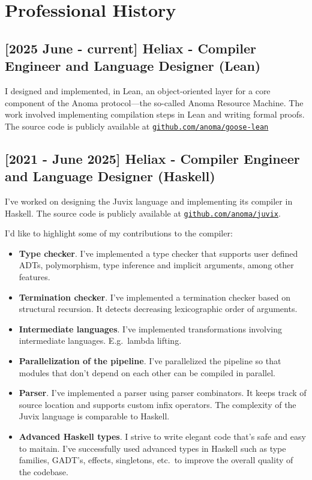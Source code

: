 \documentclass[11pt]{article}
\begin{document}
\section{Professional History}

\subsection*{[2025 June - current] Heliax - Compiler Engineer and Language Designer (Lean)}
I designed and implemented, in Lean, an object-oriented layer for a core component of the Anoma protocol—the so-called Anoma Resource Machine. The work involved implementing compilation steps in Lean and writing formal proofs. The source code is publicly available at \href{https://github.com/anoma/goose-lean}{\texttt{github.com/anoma/goose-lean}}

\subsection*{[2021 - June 2025] Heliax - Compiler Engineer and Language Designer (Haskell)}
I've worked on designing the Juvix language and implementing its compiler in Haskell.
The source code is publicly available at \href{https://github.com/anoma/juvix}{\texttt{github.com/anoma/juvix}}.

I'd like to highlight some of my contributions to the compiler:
\begin{itemize}
  \item \textbf{Type checker}. I've implemented a type checker that supports
        user defined ADTs, polymorphism, type inference and implicit arguments,
        among other features.
  \item \textbf{Termination checker}. I've implemented a termination checker based on
        structural recursion. It detects decreasing lexicographic order of
        arguments.
  \item \textbf{Intermediate languages}. I've implemented transformations
        involving intermediate languages. E.g.\ lambda lifting.
  \item \textbf{Parallelization of the pipeline}. I've parallelized the pipeline so that
        modules that don't depend on each other can be compiled in parallel.
  \item \textbf{Parser}. I've implemented a parser using parser combinators. It keeps track of source location and supports custom infix operators. The complexity of the Juvix language is comparable to Haskell.
  \item \textbf{Advanced Haskell types}. I strive to write elegant code that's
        safe and easy to maitain. I've successfully used advanced types in
        Haskell such as type families, GADT's, effects, singletons, etc.\ to
        improve the overall quality of the codebase.
\end{itemize}
\end{document}
